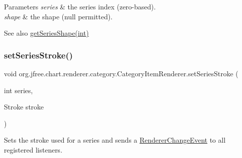 \begin{DoxyParams}{Parameters}
{\em series} & the series index (zero-\/based). \\
\hline
{\em shape} & the shape ({\ttfamily null} permitted).\\
\hline
\end{DoxyParams}
\begin{DoxySeeAlso}{See also}
\mbox{\hyperlink{interfaceorg_1_1jfree_1_1chart_1_1renderer_1_1category_1_1_category_item_renderer_a96f427b0799a82075fd19cc7be37de45}{get\+Series\+Shape(int)}} 
\end{DoxySeeAlso}
\mbox{\label{interfaceorg_1_1jfree_1_1chart_1_1renderer_1_1category_1_1_category_item_renderer_a8caf7dacd7b0db2b0d2c524b5cd9f84a}} 
\subsubsection{\texorpdfstring{set\+Series\+Stroke()}{setSeriesStroke()}}
{\footnotesize\ttfamily void org.\+jfree.\+chart.\+renderer.\+category.\+Category\+Item\+Renderer.\+set\+Series\+Stroke (\begin{DoxyParamCaption}\item[{int}]{series,  }\item[{Stroke}]{stroke }\end{DoxyParamCaption})}

Sets the stroke used for a series and sends a \mbox{\hyperlink{}{Renderer\+Change\+Event}} to all registered listeners.


